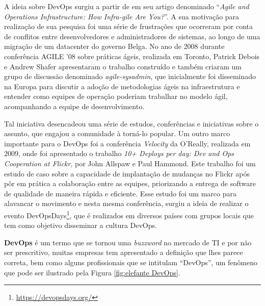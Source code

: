 \documentclass[twoside,english,brazilian]{UNISINOSartigo}
\begin{document}
A ideia sobre DevOps surgiu a partir de  em seu artigo denominado ``\textit{Agile and Operations Infrastructure: How Infra-gile Are You?}''. A sua motivação para realização de sua pesquisa foi uma série de frustrações que ocorreram por conta de conflitos entre desenvolvedores e administradores de sistemas, ao longo de uma migração de um datacenter do governo Belga.  No ano de 2008 durante conferência AGILE '08 sobre práticas ágeis, realizada em Toronto, Patrick Debois e Andrew Shafer apresentaram o trabalho construído e também criaram um grupo de discussão denominado \textit{agile-sysadmin}, que inicialmente foi disseminado na Europa para discutir a adoção de metodologias ágeis na infraestrutura e entender como equipes de operação poderiam trabalhar no modelo ágil, acompanhando a equipe de desenvolvimento.

Tal iniciativa desencadeou uma série de estudos, conferências e iniciativas sobre o assunto, que engajou a comunidade à torná-lo popular. 
Um outro marco importante para o DevOps foi a conferência \textit{Velocity} da O'Really, realizada em 2009, onde foi apresentado o trabalho \textit{10+ Deploys per day: Dev and Ops Cooperation at Flickr}, por John Allspaw e Paul Hammond. Este trabalho foi um estudo de caso sobre a capacidade de implantação de mudanças no Flickr após pôr em prática a colaboração entre as equipes, priorizando a entrega de software de qualidade de maneira rápida e eficiente.
Esse estudo foi um marco para alavancar o movimento e nesta mesma conferência, surgiu a ideia de realizar o evento DevOpsDays\footnote{\url{https://devopsdays.org/}}, que é realizados em diversos países com grupos locais que tem como objetivo disseminar a cultura DevOps.


\textbf{DevOps} é um termo que se tornou uma \textit{buzzword} no mercado de TI e  por não ser prescritivo, muitas empresas tem apresentado a definição que lhes parece correta, bem como alguns profissionais que se intitulam ``DevOps'', um fenômeno que pode ser ilustrado pela Figura \ref{fig:elefante DevOps}.
\end{document}

